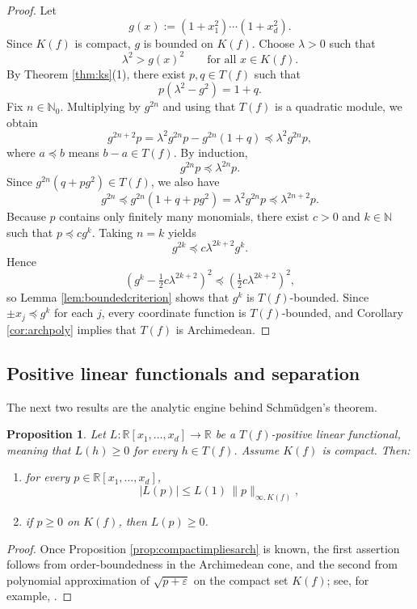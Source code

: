 \documentclass[11pt]{amsart}
\numberwithin{equation}{section}
\newtheorem{proposition}[theorem]{Proposition}
\theoremstyle{definition}
\theoremstyle{remark}
\newcommand{\R}{\mathbb{R}}
\newcommand{\N}{\mathbb{N}}
\newcommand{\Rxd}{\R[x_1,\dots,x_d]}
\newcommand{\eps}{\varepsilon}
\newcommand{\1}{\mathbf{1}}
\begin{document}
\begin{proof}
Let
\[
g(x):=(1+x_1^2)\cdots(1+x_d^2).
\]
Since \(K(f)\) is compact, \(g\) is bounded on \(K(f)\). Choose \(\lambda>0\) such that
\[
\lambda^2>g(x)^2 \qquad \text{for all } x\in K(f).
\]
By Theorem \ref{thm:ks}\textup{(1)}, there exist \(p,q\in T(f)\) such that
\[
p(\lambda^2-g^2)=1+q.
\]
Fix \(n\in\N_0\). Multiplying by \(g^{2n}\) and using that \(T(f)\) is a quadratic module, we obtain
\[
g^{2n+2}p=\lambda^2g^{2n}p-g^{2n}(1+q)\preceq \lambda^2g^{2n}p,
\]
where \(a\preceq b\) means \(b-a\in T(f)\). By induction,
\[
g^{2n}p\preceq \lambda^{2n}p.
\]
Since \(g^{2n}(q+pg^2)\in T(f)\), we also have
\[
g^{2n}\preceq g^{2n}(1+q+pg^2)=\lambda^2g^{2n}p\preceq \lambda^{2n+2}p.
\]
Because \(p\) contains only finitely many monomials, there exist \(c>0\) and \(k\in\N\) such that \(p\preceq c g^k\). Taking \(n=k\) yields
\[
g^{2k}\preceq c\lambda^{2k+2}g^k.
\]
Hence
\[
\left(g^k-\tfrac12 c\lambda^{2k+2}\right)^2\preceq \left(\tfrac12 c\lambda^{2k+2}\right)^2,
\]
so Lemma \ref{lem:boundedcriterion} shows that \(g^k\) is \(T(f)\)-bounded. Since \(\pm x_j\preceq g^k\) for each \(j\), every coordinate function is \(T(f)\)-bounded, and Corollary \ref{cor:archpoly} implies that \(T(f)\) is Archimedean.
\end{proof}

\subsection{Positive linear functionals and separation}

The next two results are the analytic engine behind Schm\"udgen's theorem.

\begin{proposition}\label{prop:boundL}
Let \(L:\Rxd\to\R\) be a \(T(f)\)-positive linear functional, meaning that \(L(h)\ge 0\) for every \(h\in T(f)\). Assume \(K(f)\) is compact. Then:
\begin{enumerate}[label=\textup{(\roman*)}, leftmargin=2em]
\item for every \(p\in\Rxd\),
\[
|L(p)|\le L(1)\,\|p\|_{\infty,K(f)},
\]
\item if \(p\ge 0\) on \(K(f)\), then \(L(p)\ge 0\).
\end{enumerate}
\end{proposition}

\begin{proof}
Once Proposition \ref{prop:compactimpliesarch} is known, the first assertion follows from order-boundedness in the Archimedean cone, and the second from polynomial approximation of \(\sqrt{p+\eps}\) on the compact set \(K(f)\); see, for example, \cite[Prop.~12.23]{SchmudgenBook}.
\end{proof}
\end{document}
